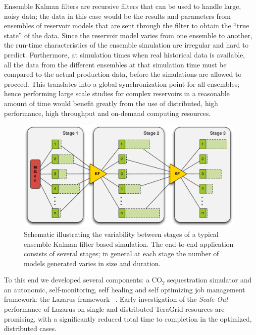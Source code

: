 \documentclass[a4paper,10pt]{article}
\begin{document}
Ensemble Kalman filters are recursive filters that can be used to handle large, noisy data; the data in this case would be the results and parameters from ensembles of reservoir models that are sent through the filter to obtain the ``true state'' of the data. Since the reservoir model varies from one ensemble to another, the run-time characteristics of the ensemble simulation are irregular and hard to predict. Furthermore, at simulation times when real historical data is available, all the data from the different ensembles at that simulation time must be compared to the actual production data, before the simulations are allowed to proceed. This translates into a global synchronization point for all ensembles; hence performing large scale studies for complex reservoirs in a reasonable amount of time would benefit greatly from the use of distributed, high performance, high throughput and on-demand computing resources.

\begin{figure}
\begin{center}
\includegraphics*[scale=0.4,angle=0]{3StageKalmanFilter}
\end{center}
\caption{Schematic illustrating the variability between stages of a typical
  ensemble Kalman filter based simulation. The end-to-end
  application consists of several stages; in general at each stage the
  number of models generated varies in size and duration.}
\label{fig:irregular_execution}
\end{figure}

To this end we developed several components: a CO$_2$ sequestration simulator and an autonomic, self-monitoring, self healing and self optimizing job management framework: the Lazarus framework ~\cite{gmac}. Early investigation of the {\it Scale-Out} performance of Lazarus on single and distributed TeraGrid resources are promising, with a significantly reduced total time to completion in the optimized, distributed cases.
\end{document}
